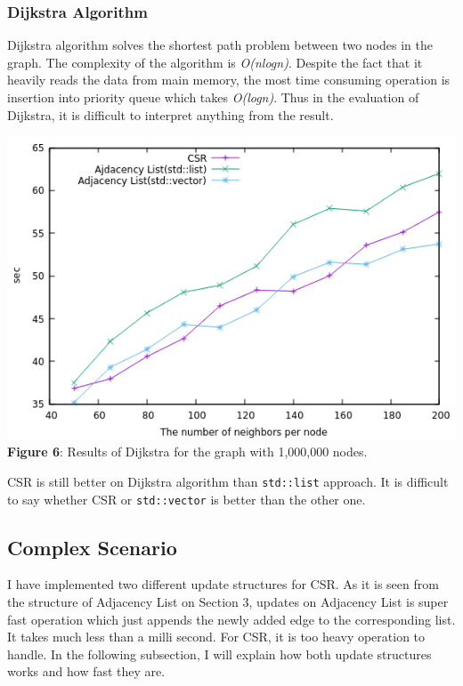 \documentclass{article}
\begin{document}
\subsubsection*{Dijkstra Algorithm}
Dijkstra algorithm solves the shortest path problem between two nodes in the graph. The complexity of the algorithm is \textit{O(nlogn)}. Despite the fact that it heavily reads the data from main memory, the most time consuming operation is insertion into priority queue which takes \textit{O(logn)}. Thus in the evaluation of Dijkstra, it is difficult to interpret anything from the result.\\
\begin{center}
\includegraphics[scale = 0.6]{Dijkstra}\\
\textbf{Figure 6}: Results of Dijkstra for the graph with 1,000,000 nodes.
\end{center}
 CSR is still better on Dijkstra algorithm than \texttt{std::list} approach. It is difficult to say whether CSR or \texttt{std::vector} is better than the other one.
\subsection{Complex Scenario}
 I have implemented two different update structures for CSR. As it is seen from the structure of Adjacency List on Section 3, updates on Adjacency List is super fast operation which just appends the newly added edge to the corresponding list. It takes much less than a milli second. For CSR, it is too heavy operation to handle. In the following subsection, I will explain how both update structures works and how fast they are.
 
\end{document}
